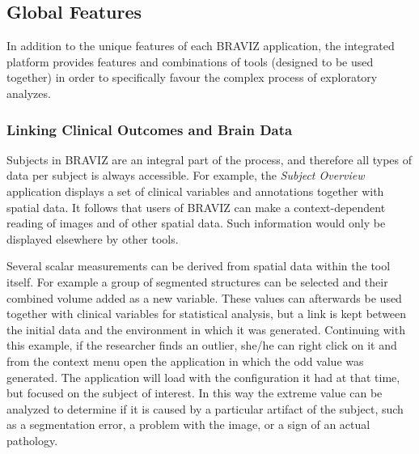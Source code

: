 \documentclass{frontiersHLTH}
\begin{document}
\subsection{Global Features}

In addition to the unique features of each BRAVIZ application, the integrated platform provides features and combinations of tools (designed to be used together) in order to specifically favour the complex process of exploratory analyzes.


\subsubsection{Linking Clinical Outcomes and Brain Data}

Subjects in BRAVIZ are an integral part of the process, and therefore all types of data per  subject is always accessible. For example, the \emph{Subject Overview} application displays a set of clinical variables and annotations together with spatial data. It follows that users of BRAVIZ can make a context-dependent reading of images and of other spatial data. Such information would only be displayed elsewhere by other tools.


Several scalar measurements can be derived from spatial data within the tool itself. For example a group of segmented structures can be selected and their combined volume added as a new variable. These values can afterwards be used together with clinical variables for statistical analysis, but a link is kept between the initial data and the environment in which it was generated. Continuing with this example, if the researcher finds an outlier, she/he can right click on it and from the context menu open the application in which the odd value was generated. The application will load with the configuration it had at that time, but focused on the subject of interest. In this way the extreme value can be analyzed to determine if it is caused by a particular artifact of the subject, such as a segmentation error, a problem with the image, or a sign of an actual pathology.
\end{document}

